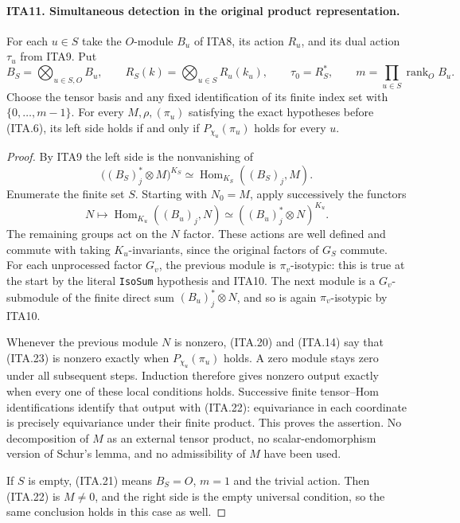\paragraph{ITA11. Simultaneous detection in the original product representation.}
\label{claim:ITA11}
For each $u\in S$ take the $O$-module $B_u$ of ITA8,
its action $R_u$, and its dual action $\tau_u$ from ITA9.
Put
\[
 B_S=\bigotimes_{u\in S,O}B_u,\qquad
 R_S(k)=\bigotimes_{u\in S}R_u(k_u),\qquad
 \tau_0=R_S^*,\qquad m=\prod_{u\in S}\operatorname{rank}_O B_u.
                                                               \tag{ITA.21}
\]
Choose the tensor basis and any fixed identification of its
finite index set with $\{0,\ldots,m-1\}$.  For every
$M,\rho,(\pi_u)$ satisfying the exact hypotheses before
(ITA.6), its left side holds if and only if
$P_{\chi_u}(\pi_u)$ holds for every $u$.
\begin{proof}
By ITA9 the left side is the nonvanishing of
\[
 \bigl((B_S)_j^*\otimes M\bigr)^{K_S}
                \simeq\operatorname{Hom}_{K_S}((B_S)_j,M).
                                                               \tag{ITA.22}
\]
Enumerate the finite set $S$.  Starting with $N_0=M$,
apply successively the functors
\[
                    N\longmapsto
                    \operatorname{Hom}_{K_u}((B_u)_j,N)
                      \simeq((B_u)_j^*\otimes N)^{K_u}.
                                                               \tag{ITA.23}
\]
The remaining groups act on the $N$ factor.  These actions
are well defined and commute with taking $K_u$-invariants,
since the original factors of $G_S$ commute.  For each
unprocessed factor $G_v$, the previous module is
$\pi_v$-isotypic: this is true at the start by the
literal \texttt{IsoSum} hypothesis and ITA10.  The next
module is a $G_v$-submodule of the finite direct sum
$(B_u)_j^*\otimes N$, and so is again $\pi_v$-isotypic
by ITA10.

Whenever the previous module $N$ is nonzero, (ITA.20)
and (ITA.14) say that (ITA.23) is nonzero exactly when
$P_{\chi_u}(\pi_u)$ holds.  A zero module stays zero
under all subsequent steps.  Induction therefore gives
nonzero output exactly when every one of these local
conditions holds.  Successive finite tensor--Hom
identifications identify that output with (ITA.22):
equivariance in each coordinate is precisely equivariance
under their finite product.  This proves the assertion.
No decomposition of $M$ as an external tensor product,
no scalar-endomorphism version of Schur's lemma, and no
admissibility of $M$ have been used.

If $S$ is empty, (ITA.21) means $B_S=O$, $m=1$ and
the trivial action.  Then (ITA.22) is $M\ne0$, and
the right side is the empty universal condition, so the
same conclusion holds in this case as well.
\end{proof}

